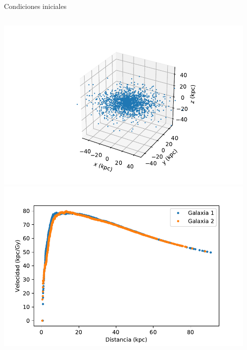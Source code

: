 \documentclass{beamer}
\begin{document}
\begin{frame}{Condiciones iniciales}
	\begin{columns}
		\begin{column}{0.5\textwidth}
			\includegraphics[height=0.35\textheight]{sources/images/galaxy_shape.pdf}\\\pause
			\includegraphics[height=0.35\textheight]{sources/images/rotation_curve.pdf}\pause
		\end{column}
		\begin{column}{0.65\textwidth}

\end{column}
\end{columns}
\end{frame}
\end{document}
